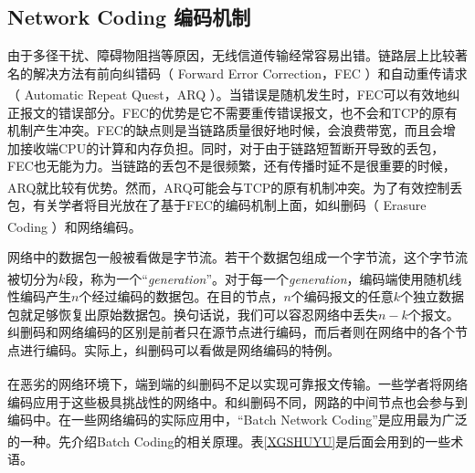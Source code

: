 \subsection{Network Coding 编码机制}
由于多径干扰、障碍物阻挡等原因，无线信道传输经常容易出错。链路层上比较著名的解决方法有前向纠错码（ Forward Error Correction，FEC ）和自动重传请求（ Automatic Repeat Quest，ARQ ）\textsuperscript{\cite{kurose2005computer}}。当错误是随机发生时，FEC可以有效地纠正报文的错误部分。FEC的优势是它不需要重传错误报文，也不会和TCP的原有机制产生冲突。FEC的缺点则是当链路质量很好地时候，会浪费带宽，而且会增加接收端CPU的计算和内存负担。同时，对于由于链路短暂断开导致的丢包，FEC也无能为力。当链路的丢包不是很频繁，还有传播时延不是很重要的时候，ARQ就比较有优势。然而，ARQ可能会与TCP的原有机制冲突\textsuperscript{\cite{kurose2005computer}}。为了有效控制丢包，有关学者将目光放在了基于FEC的编码机制上面，如纠删码（ Erasure Coding ）\textsuperscript{\cite{rizzo1997effective}}和网络编码\textsuperscript{\cite{Ahlswede2000,chou2003practical,algebraicapproach}}。
\par
网络中的数据包一般被看做是字节流。若干个数据包组成一个字节流，这个字节流被切分为$k$段，称为一个“\emph{generation}”\textsuperscript{\cite{chou2003practical}}。对于每一个\emph{generation}，编码端使用随机线性编码产生$n$个经过编码的数据包。在目的节点，$n$个编码报文的任意$k$个独立数据包就足够恢复出原始数据包。换句话说，我们可以容忍网络中丢失$n-k$个报文。纠删码和网络编码的区别是前者只在源节点进行编码，而后者则在网络中的各个节点进行编码。实际上，纠删码可以看做是网络编码的特例。
\par
在恶劣的网络环境下，端到端的纠删码不足以实现可靠报文传输\textsuperscript{\cite{4753100}}。一些学者将网络编码应用于这些极具挑战性的网络中。和纠删码不同，网路的中间节点也会参与到编码中。在一些网络编码的实际应用中，“Batch Network Coding”是应用最为广泛的一种\textsuperscript{\cite{chachulski2007trading,algebraicapproach,chou2003practical,ho2003randomized,chen2009codecast,4015713}}。先介绍Batch Coding的相关原理。表\ref{XGSHUYU}是后面会用到的一些术语。
